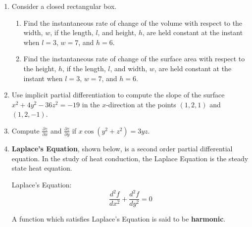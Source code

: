 \documentclass[12pt]{article}
\newif\ifans
\begin{document}
\begin{enumerate}
\begin{enumerate}
\ifans{\fbox{$-2(x-1)-6(y-1)+1(z-4)=0$}} \fi

\end{enumerate}

\newpage

\item Consider a closed rectangular box.

\begin{enumerate}

\item Find the instantaneous rate of change of the volume with respect to the width, $w$, if the length, $l$, and  height, $h$, are held constant at the instant when $l=3$, $w=7$, and $h=6$.

\ifans{\fbox{18}} \fi

\item Find the instantaneous rate of change of the surface area with respect to the height, $h$, if the length, $l$, and  width, $w$, are held constant at the instant when $l=3$, $w=7$, and $h=6$.

\ifans{\fbox{20}} \fi

\end{enumerate}

\item Use implicit partial differentiation to compute the slope of the surface $x^2+4y^2-36z^2=-19$ in the $x$-direction at the points $(1,2,1)$ and $(1,2,-1)$.

\ifans{\fbox{$\left.\frac{\partial z}{\partial x}\right|_{(x,y,z)=(1,2,1)}=\frac{1}{36}$; $\left.\frac{\partial z}{\partial x}\right|_{(x,y,z)=(1,2,-1)}=-\frac{1}{36}$}} \fi

\item Compute $\frac{\partial z}{\partial x}$ and $\frac{\partial z}{\partial y}$ if $x\cos{(y^2+z^2)}=3yz$.

\ifans{\fbox{$\frac{\partial z}{\partial x}=\frac{\cos{(y^2+z^2)}}{3y+2zx\sin{(x^2+y^2)}}$; $\frac{\partial z}{\partial y}=\frac{-3z-2xy\sin{(y^2+z^2)}}{3y+2xz\sin{(y^2+z^2)}}$}} \fi

\item {\bf Laplace's Equation}, shown below, is a second order partial differential equation.  In the study of heat conduction, the Laplace Equation is the steady state heat equation.
\begin{center}
Laplace's Equation:
$$\frac{d^2f}{dx^2}+\frac{d^2f}{dy^2}=0$$
\end{center}

A function which satisfies Laplace's Equation is said to be {\bf harmonic}.


\end{enumerate}
\end{document}
